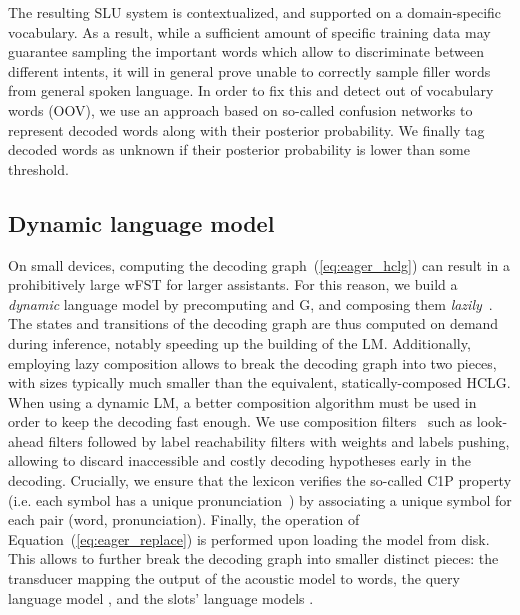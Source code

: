 \documentclass{article}
\begin{document}
The resulting SLU system is contextualized, and supported on a domain-specific vocabulary. 
  As a result, while a sufficient amount of specific training data may guarantee sampling the important words which allow to discriminate between different intents, it will in general prove unable to correctly sample filler words from general spoken language. 
  In order to fix this and detect out of vocabulary words (OOV), we use an approach based on so-called confusion networks \cite{xu2011minimum} to represent decoded words along with their posterior probability. We finally tag decoded words as unknown if their posterior probability is lower than some threshold.

\subsection{Dynamic language model}
\label{sec:dynamic_lm}


  On small devices, computing the decoding graph~(\ref{eq:eager_hclg}) can result in a prohibitively large wFST for larger assistants. 
  For this reason, we build a \emph{dynamic} language model by precomputing  and G, and composing them \emph{lazily}~\cite{allauzen2010filters}. 
  The states and transitions of the  decoding graph are thus computed on demand during inference, notably speeding up the building of the LM. 
  Additionally, employing lazy composition allows to break the decoding graph into two pieces, with sizes typically much smaller than the equivalent, statically-composed HCLG. 
  When using a dynamic LM, a better composition algorithm must be used in order to keep the decoding fast enough. 
  We use composition filters~\cite{allauzen2010filters} such as look-ahead filters followed by label reachability filters with weights and labels pushing, allowing to discard inaccessible and costly decoding hypotheses early in the decoding. 
  Crucially, we ensure that the lexicon verifies the so-called C1P property (i.e. each symbol has a unique pronunciation~\cite{allauzen2009generalized}) by associating a unique symbol for each pair (word, pronunciation).
  Finally, the  operation of Equation~(\ref{eq:eager_replace}) is performed upon loading the model from disk. 
  This allows to further break the decoding graph into smaller distinct pieces: the  transducer mapping the output of the acoustic model to words, the query language model , and the slots' language models .
\end{document}
